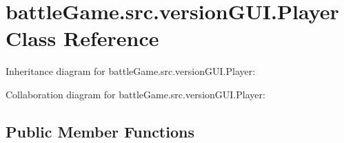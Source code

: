 \hypertarget{classbattleGame_1_1src_1_1versionGUI_1_1Player}{}\section{battle\+Game.\+src.\+version\+G\+U\+I.\+Player Class Reference}
\label{classbattleGame_1_1src_1_1versionGUI_1_1Player}


Inheritance diagram for battle\+Game.\+src.\+version\+G\+U\+I.\+Player\+:


Collaboration diagram for battle\+Game.\+src.\+version\+G\+U\+I.\+Player\+:
\subsection*{Public Member Functions}
